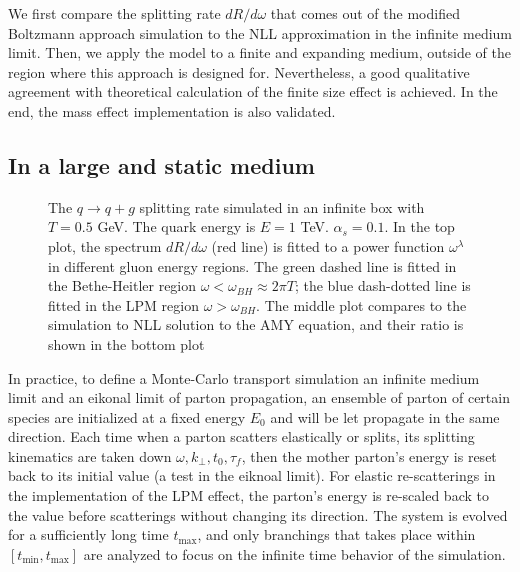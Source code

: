 We first compare the splitting rate $dR/d\omega$ that comes out of the modified Boltzmann approach simulation to the NLL approximation in the infinite medium limit.
Then, we apply the model to a finite and expanding medium, outside of the region where this approach is designed for.
Nevertheless, a good qualitative agreement with theoretical calculation of the finite size effect is achieved.
In the end, the mass effect implementation is also validated.

\subsection{In a large and static medium}
\begin{figure}
\caption{The $q\rightarrow q+g$ splitting rate simulated in an infinite box with $T=0.5$ GeV. The quark energy is $E=1$ TeV. $\alpha_s = 0.1$. In the top plot, the spectrum $dR/d\omega$ (red line) is fitted to a power function $\omega^\lambda$ in different gluon energy regions. The green dashed line is fitted in the Bethe-Heitler region $\omega < \omega_{BH}\approx 2\pi T$; the blue dash-dotted line is fitted in the LPM region $\omega > \omega_{BH}$. The middle plot compares to the simulation to NLL solution to the AMY equation, and their ratio is shown in the bottom plot}
\label{fig:spectrum}
\end{figure}

In practice, to define a Monte-Carlo transport simulation an infinite medium limit and an eikonal limit of parton propagation, an ensemble of parton of certain species are initialized at a fixed energy $E_0$ and will be let propagate in the same direction.
Each time when a parton scatters elastically or splits, its splitting kinematics are taken down $\omega, k_\perp, t_0, \tau_f$, then the mother parton's energy is reset back to its initial value (a test in the eiknoal limit).
For elastic re-scatterings in the implementation of the LPM effect, the parton's energy is re-scaled back to the value before scatterings without changing its direction.
The system is evolved for a sufficiently long time $t_{\max}$, and only branchings that takes place within $[t_{\min}, t_{\max}]$ are analyzed to focus on the infinite time behavior of the simulation.

